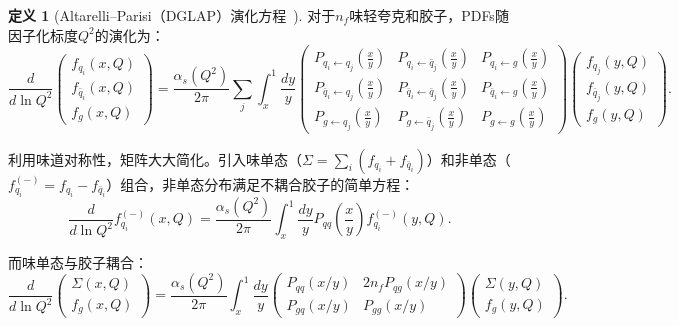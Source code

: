 \documentclass[12pt,a4paper]{ctexart}
\theoremstyle{definition}
\newtheorem{definition}{定义}[section]
\begin{document}
\begin{definition}[Altarelli--Parisi（DGLAP）演化方程~\cite{AltarelliParisi1977,PeskinSchroeder1995}]
对于$n_f$味轻夸克和胶子，PDFs随因子化标度$Q^2$的演化为：
\begin{equation}
\boxed{\frac{d}{d\ln Q^2}
\begin{pmatrix} f_{q_i}(x, Q) \\ f_{\bar q_i}(x, Q) \\ f_g(x, Q) \end{pmatrix}
= \frac{\alpha_s(Q^2)}{2\pi} \sum_j \int_x^1 \frac{dy}{y}
\begin{pmatrix}
P_{q_i\leftarrow q_j}(\frac{x}{y}) & P_{q_i\leftarrow \bar q_j}(\frac{x}{y}) & P_{q_i\leftarrow g}(\frac{x}{y}) \\[3pt]
P_{\bar q_i\leftarrow q_j}(\frac{x}{y}) & P_{\bar q_i\leftarrow \bar q_j}(\frac{x}{y}) & P_{\bar q_i\leftarrow g}(\frac{x}{y}) \\[3pt]
P_{g\leftarrow q_j}(\frac{x}{y}) & P_{g\leftarrow \bar q_j}(\frac{x}{y}) & P_{g\leftarrow g}(\frac{x}{y})
\end{pmatrix}
\begin{pmatrix} f_{q_j}(y, Q) \\ f_{\bar q_j}(y, Q) \\ f_g(y, Q) \end{pmatrix}}.
\label{eq:DGLAP_full}
\end{equation}
\end{definition}

利用味道对称性，矩阵大大简化。引入味单态（$\Sigma = \sum_i (f_{q_i}+f_{\bar q_i})$）和非单态（$f_{q_i}^{(-)} = f_{q_i} - f_{\bar q_i}$）组合，非单态分布满足不耦合胶子的简单方程：
\begin{equation}
\frac{d}{d\ln Q^2} f_{q_i}^{(-)}(x, Q) = \frac{\alpha_s(Q^2)}{2\pi} \int_x^1 \frac{dy}{y} P_{qq}\!\left(\frac{x}{y}\right) f_{q_i}^{(-)}(y, Q).
\label{eq:DGLAP_nonsinglet}
\end{equation}

而味单态与胶子耦合：
\begin{equation}
\frac{d}{d\ln Q^2} \begin{pmatrix} \Sigma(x, Q) \\ f_g(x, Q) \end{pmatrix}
= \frac{\alpha_s(Q^2)}{2\pi} \int_x^1 \frac{dy}{y}
\begin{pmatrix} P_{qq}(x/y) & 2n_f P_{qg}(x/y) \\ P_{gq}(x/y) & P_{gg}(x/y) \end{pmatrix}
\begin{pmatrix} \Sigma(y, Q) \\ f_g(y, Q) \end{pmatrix}.
\label{eq:DGLAP_singlet}
\end{equation}
\end{document}
